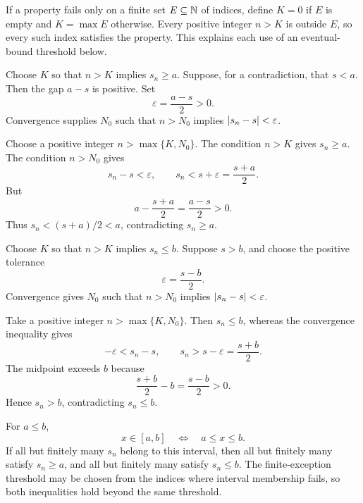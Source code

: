 If a property fails only on a finite set $E\subseteq\mathbb{N}$ of indices,
define $K=0$ if $E$ is empty and $K=\max E$ otherwise.
Every positive integer $n>K$ is outside $E$, so every such index
satisfies the property. This explains each use of an eventual-bound
threshold below.

Choose $K$ so that $n>K$ implies $s_n\ge a$.
Suppose, for a contradiction, that $s<a$. Then the gap $a-s$ is
positive. Set
\[
 \varepsilon=\frac{a-s}{2}>0.
\]
Convergence supplies $N_0$ such that $n>N_0$ implies
$\left|s_n-s\right|<\varepsilon$.

Choose a positive integer $n>\max\{K,N_0\}$.
The condition $n>K$ gives $s_n\ge a$. The condition $n>N_0$ gives
\[
 s_n-s<\varepsilon,\qquad
 s_n<s+\varepsilon=\frac{s+a}{2}.
\]
But
\[
 a-\frac{s+a}{2}=\frac{a-s}{2}>0.
\]
Thus $s_n<(s+a)/2<a$, contradicting $s_n\ge a$.


Choose $K$ so that $n>K$ implies $s_n\le b$.
Suppose $s>b$, and choose the positive tolerance
\[
 \varepsilon=\frac{s-b}{2}.
\]
Convergence gives $N_0$ such that $n>N_0$ implies
$\left|s_n-s\right|<\varepsilon$.

Take a positive integer $n>\max\{K,N_0\}$.
Then $s_n\le b$, whereas the convergence inequality gives
\[
 -\varepsilon<s_n-s,\qquad
 s_n>s-\varepsilon=\frac{s+b}{2}.
\]
The midpoint exceeds $b$ because
\[
 \frac{s+b}{2}-b=\frac{s-b}{2}>0.
\]
Hence $s_n>b$, contradicting $s_n\le b$.


For $a\le b$,
\[
 x\in[a,b]\quad\Longleftrightarrow\quad a\le x\le b.
\]
If all but finitely many $s_n$ belong to this interval, then all but
finitely many satisfy $s_n\ge a$, and all but finitely many satisfy
$s_n\le b$. The finite-exception threshold may be chosen from the
indices where interval membership fails, so both inequalities hold
beyond the same threshold.


